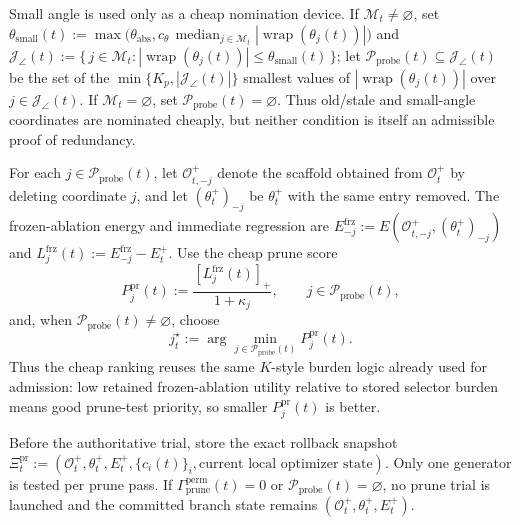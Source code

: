 \documentclass[11pt]{article}
\begin{document}
Small angle is used only as a cheap nomination device. If \(\mathcal M_t\neq\varnothing\), set \(\theta_{\mathrm{small}}(t):=\max\!\bigl(\theta_{\mathrm{abs}},c_\theta\,\operatorname{median}_{j\in\mathcal M_t}|\operatorname{wrap}(\theta_j(t))|\bigr)\) and \(\mathcal J_{\angle}(t):=\{\,j\in\mathcal M_t:|\operatorname{wrap}(\theta_j(t))|\le \theta_{\mathrm{small}}(t)\,\}\); let \(\mathcal P_{\mathrm{probe}}(t)\subseteq\mathcal J_{\angle}(t)\) be the set of the \(\min\{K_p,|\mathcal J_{\angle}(t)|\}\) smallest values of \(|\operatorname{wrap}(\theta_j(t))|\) over \(j\in\mathcal J_{\angle}(t)\). If \(\mathcal M_t=\varnothing\), set \(\mathcal P_{\mathrm{probe}}(t)=\varnothing\). Thus old/stale and small-angle coordinates are nominated cheaply, but neither condition is itself an admissible proof of redundancy.

For each \(j\in\mathcal P_{\mathrm{probe}}(t)\), let \(\mathcal O_{t,-j}^+\) denote the scaffold obtained from \(\mathcal O_t^+\) by deleting coordinate \(j\), and let \((\theta_t^+)_{-j}\) be \(\theta_t^+\) with the same entry removed. The frozen-ablation energy and immediate regression are \(E_{-j}^{\mathrm{frz}}:=E(\mathcal O_{t,-j}^+,(\theta_t^+)_{-j})\) and \(L_j^{\mathrm{frz}}(t):=E_{-j}^{\mathrm{frz}}-E_t^+\). Use the cheap prune score
\[
P_j^{\mathrm{pr}}(t)
:=
\frac{[L_j^{\mathrm{frz}}(t)]_+}{1+\kappa_j},
\qquad
j\in\mathcal P_{\mathrm{probe}}(t),
\]
and, when \(\mathcal P_{\mathrm{probe}}(t)\neq\varnothing\), choose
\[
j_t^\star
:=
\arg\min_{j\in\mathcal P_{\mathrm{probe}}(t)}
P_j^{\mathrm{pr}}(t).
\]
Thus the cheap ranking reuses the same \(K\)-style burden logic already used for admission: low retained frozen-ablation utility relative to stored selector burden means good prune-test priority, so smaller \(P_j^{\mathrm{pr}}(t)\) is better.

Before the authoritative trial, store the exact rollback snapshot \(\Xi_t^{\mathrm{pr}}:=(\mathcal O_t^+,\theta_t^+,E_t^+,\{c_i(t)\}_i,\text{current local optimizer state})\). Only one generator is tested per prune pass. If \(\Gamma_{\mathrm{prune}}^{\mathrm{perm}}(t)=0\) or \(\mathcal P_{\mathrm{probe}}(t)=\varnothing\), no prune trial is launched and the committed branch state remains \((\mathcal O_t^+,\theta_t^+,E_t^+)\).
\end{document}
